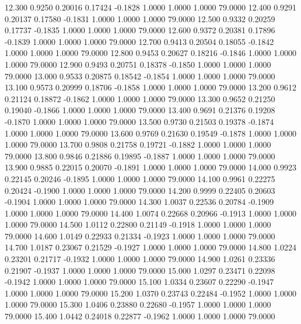   12.300   0.9250   0.20016   0.17424  -0.1828   1.0000   1.0000   1.0000  79.0000
  12.400   0.9291   0.20137   0.17580  -0.1831   1.0000   1.0000   1.0000  79.0000
  12.500   0.9332   0.20259   0.17737  -0.1835   1.0000   1.0000   1.0000  79.0000
  12.600   0.9372   0.20381   0.17896  -0.1839   1.0000   1.0000   1.0000  79.0000
  12.700   0.9413   0.20504   0.18055  -0.1842   1.0000   1.0000   1.0000  79.0000
  12.800   0.9453   0.20627   0.18216  -0.1846   1.0000   1.0000   1.0000  79.0000
  12.900   0.9493   0.20751   0.18378  -0.1850   1.0000   1.0000   1.0000  79.0000
  13.000   0.9533   0.20875   0.18542  -0.1854   1.0000   1.0000   1.0000  79.0000
  13.100   0.9573   0.20999   0.18706  -0.1858   1.0000   1.0000   1.0000  79.0000
  13.200   0.9612   0.21124   0.18872  -0.1862   1.0000   1.0000   1.0000  79.0000
  13.300   0.9652   0.21250   0.19040  -0.1866   1.0000   1.0000   1.0000  79.0000
  13.400   0.9691   0.21376   0.19208  -0.1870   1.0000   1.0000   1.0000  79.0000
  13.500   0.9730   0.21503   0.19378  -0.1874   1.0000   1.0000   1.0000  79.0000
  13.600   0.9769   0.21630   0.19549  -0.1878   1.0000   1.0000   1.0000  79.0000
  13.700   0.9808   0.21758   0.19721  -0.1882   1.0000   1.0000   1.0000  79.0000
  13.800   0.9846   0.21886   0.19895  -0.1887   1.0000   1.0000   1.0000  79.0000
  13.900   0.9885   0.22015   0.20070  -0.1891   1.0000   1.0000   1.0000  79.0000
  14.000   0.9923   0.22145   0.20246  -0.1895   1.0000   1.0000   1.0000  79.0000
  14.100   0.9961   0.22275   0.20424  -0.1900   1.0000   1.0000   1.0000  79.0000
  14.200   0.9999   0.22405   0.20603  -0.1904   1.0000   1.0000   1.0000  79.0000
  14.300   1.0037   0.22536   0.20784  -0.1909   1.0000   1.0000   1.0000  79.0000
  14.400   1.0074   0.22668   0.20966  -0.1913   1.0000   1.0000   1.0000  79.0000
  14.500   1.0112   0.22800   0.21149  -0.1918   1.0000   1.0000   1.0000  79.0000
  14.600   1.0149   0.22933   0.21334  -0.1923   1.0000   1.0000   1.0000  79.0000
  14.700   1.0187   0.23067   0.21529  -0.1927   1.0000   1.0000   1.0000  79.0000
  14.800   1.0224   0.23201   0.21717  -0.1932   1.0000   1.0000   1.0000  79.0000
  14.900   1.0261   0.23336   0.21907  -0.1937   1.0000   1.0000   1.0000  79.0000
  15.000   1.0297   0.23471   0.22098  -0.1942   1.0000   1.0000   1.0000  79.0000
  15.100   1.0334   0.23607   0.22290  -0.1947   1.0000   1.0000   1.0000  79.0000
  15.200   1.0370   0.23743   0.22484  -0.1952   1.0000   1.0000   1.0000  79.0000
  15.300   1.0406   0.23880   0.22680  -0.1957   1.0000   1.0000   1.0000  79.0000
  15.400   1.0442   0.24018   0.22877  -0.1962   1.0000   1.0000   1.0000  79.0000
